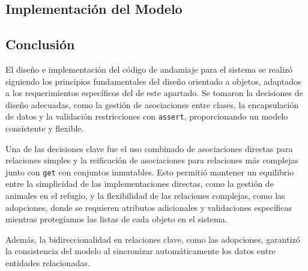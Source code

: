 \newpage



\subsection{Implementación del Modelo}


\subsection{Conclusión}

El diseño e implementación del código de andamiaje para el sistema se realizó siguiendo 
los principios fundamentales del diseño orientado a objetos, adaptados a los requerimientos 
específicos del de este apartado. Se tomaron la decisiones de diseño adecuadas, como la gestión 
de asociaciones entre clases, la encapsulación de datos y la validación restricciones con \texttt{assert}, 
proporcionando un modelo consistente y flexible.\par
\vspace{0.15cm}
Una de las decisiones clave fue el uso combinado de asociaciones directas para relaciones 
simples y la reificación de asociaciones para relaciones más complejas junto con \texttt{get}
con conjuntos inmutables. Esto permitió mantener un equilibrio entre la simplicidad de las 
implementaciones directas, como la gestión de animales en el refugio, y la flexibilidad 
de las relaciones complejas, como las adopciones, donde se requieren atributos adicionales 
y validaciones específicas mientras protegíamos las listas de cada objeto en el sistema.\par
\vspace{0.15cm}
Además, la bidireccionalidad en relaciones clave, como las adopciones, garantizó la 
consistencia del modelo al sincronizar automáticamente los datos entre entidades 
relacionadas.\par

\newpage
